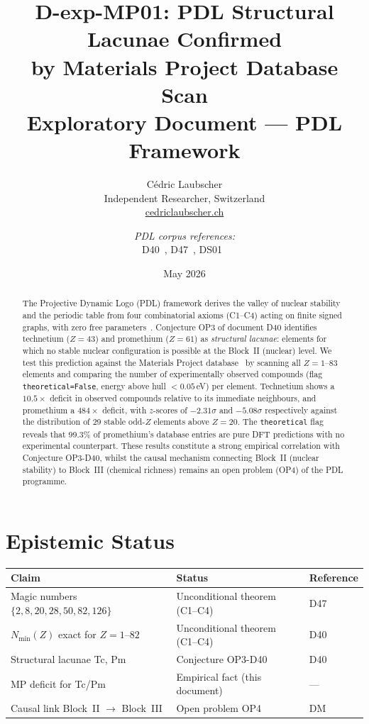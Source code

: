 \documentclass[11pt,a4paper]{article}
\title{\textbf{D-exp-MP01: PDL Structural Lacunae Confirmed\\
by Materials Project Database Scan}\\[6pt]
{\large Exploratory Document — PDL Framework}}
\author{Cédric Laubscher\\[4pt]
\small Independent Researcher, Switzerland\\
\small \href{https://cedriclaubscher.ch}{cedriclaubscher.ch}
\and
\small \textit{PDL corpus references:}\\
\small D40~\cite{Laubscher_D40_2025},
       D47~\cite{Laubscher_D47_2025},
       DS01~\cite{Laubscher_DS01_2025}}
\date{May 2026}
\theoremstyle{definition}
\theoremstyle{remark}
\begin{document}
\maketitle

\begin{abstract}
The Projective Dynamic Logo (PDL) framework derives the valley of nuclear stability and the periodic table from four combinatorial axioms (C1--C4) acting on finite signed graphs, with zero free parameters~\cite{Laubscher_D40_2025,Laubscher_D47_2025}. Conjecture OP3 of document D40 identifies technetium ($Z=43$) and promethium ($Z=61$) as \emph{structural lacunae}: elements for which no stable nuclear configuration is possible at the Block~II (nuclear) level. We test this prediction against the Materials Project database~\cite{Jain_2013} by scanning all $Z=1$--$83$ elements and comparing the number of experimentally observed compounds (flag \texttt{theoretical=False}, energy above hull $<0.05$\,eV) per element. Technetium shows a $10.5\times$ deficit in observed compounds relative to its immediate neighbours, and promethium a $484\times$ deficit, with $z$-scores of $-2.31\sigma$ and $-5.08\sigma$ respectively against the distribution of 29 stable odd-$Z$ elements above $Z=20$. The \texttt{theoretical} flag reveals that 99.3\% of promethium's database entries are pure DFT predictions with no experimental counterpart. These results constitute a strong empirical correlation with Conjecture OP3-D40, whilst the causal mechanism connecting Block~II (nuclear stability) to Block~III (chemical richness) remains an open problem (OP4) of the PDL programme.
\end{abstract}

\tableofcontents

\section*{Epistemic Status}

\begin{epistemicbox}
\begin{center}
\renewcommand{\arraystretch}{1.3}
\begin{tabular}{lll}
\toprule
\textbf{Claim} & \textbf{Status} & \textbf{Reference} \\
\midrule
Magic numbers $\{2,8,20,28,50,82,126\}$ & Unconditional theorem (C1--C4) & D47~\cite{Laubscher_D47_2025} \\
$N_{\min}(Z)$ exact for $Z=1$--$82$ & Unconditional theorem (C1--C4) & D40~\cite{Laubscher_D40_2025} \\
Structural lacunae Tc, Pm & Conjecture OP3-D40 & D40~\cite{Laubscher_D40_2025} \\
MP deficit for Tc/Pm & Empirical fact (this document) & --- \\
Causal link Block~II $\to$ Block~III & Open problem OP4 & DM~\cite{Laubscher_DM_2025} \\
\bottomrule
\end{tabular}
\end{center}
\end{epistemicbox}
\end{document}
